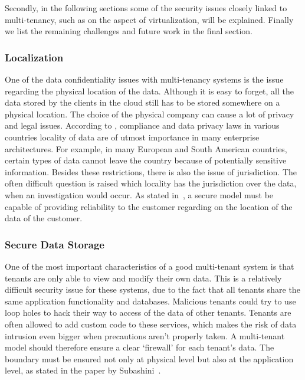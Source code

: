 Secondly, in the following sections some of the security issues closely linked to multi-tenancy, such as on the aspect of virtualization, will be explained. 
Finally we list the remaining challenges and future work in the final section.

\subsubsection{Localization}
One of the data confidentiality issues with multi-tenancy systems is the issue regarding the physical location of the data. 
Although it is easy to forget, all the data stored by the clients in the cloud still has to be stored somewhere on a physical location. 
The choice of the physical company can cause a lot of privacy and legal issues. 
According to , compliance and data privacy laws in various countries locality of data are of utmost importance in many enterprise architectures. 
For example, in many European and South American countries, certain types of data cannot leave the country because of potentially sensitive information. 
Besides these restrictions, there is also the issue of jurisdiction.
The often difficult question is raised which locality has the jurisdiction over the data, when an investigation would occur.
As stated in~\cite{Subashini2011Security}, a secure model must be capable of providing reliability to the customer regarding on the location of the data of the customer.

\subsubsection{Secure Data Storage}
One of the most important characteristics of a good multi-tenant system is that tenants are only able to view and modify their own data. This is a relatively difficult security issue for these systems, due to the fact that all tenants share the same application functionality and databases. Malicious tenants could try to use loop holes to hack their way to access of the data of other tenants. Tenants are often allowed to add custom code to these services, which makes the risk of data intrusion even bigger when precautions aren’t properly taken. A multi-tenant model should therefore ensure a clear ‘firewall’ for each tenant’s data. The boundary must be ensured not only at physical level but also at the application level, as stated in the paper by Subashini~\cite{Subashini2011Security}.

